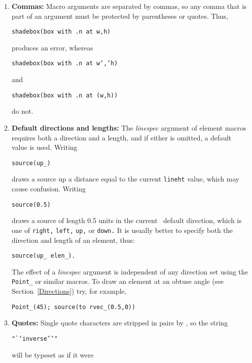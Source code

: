 \begin{enumerate}
{\tt line from A to B; resistor from B to C}

\noindent when it should be

{\tt line from A to B; resistor(from B to C)}

\noindent This error is caused by an unfortunate inconsistency between the
linear \pic\ objects and the way \Mfour\ passes macro arguments.

\item 
{\bf Commas:}
Macro arguments are separated by commas, so any comma that is
part of an argument must be protected by parentheses or quotes.  Thus,

{\tt shadebox(box with .n at w,h)}

\noindent produces an error, whereas

{\tt shadebox(box with .n at w`,'h)}

\noindent and

{\tt shadebox(box with .n at (w,h))}

\noindent do not.

\item 
{\bf Default directions and lengths:}
The {\em linespec} argument of element
macros requires both a direction and a length, and if either is omitted,
a default value is used.  Writing

{\tt source(up\_)}

\noindent draws a source up a distance equal to the current
{\tt lineht} value, which may cause confusion.
Writing

{\tt source(0.5)}

\noindent draws a source of length 0.5 units
in the current \pic\ default direction, which is one of
{\tt right,} {\tt left,} {\tt up,} or {\tt down.}
It is usually better
to specify both the direction and length of an element, thus:

{\tt source(up\_ elen\_).}

The effect of a {\em linespec} argument is independent of any direction
set using the {\tt Point\_} or similar macros. 
To draw an element at an obtuse angle (see Section~\ref{Directions}) try,
for example,

{\tt Point\_(45); source(to rvec\_(0.5,0))}

\item 
{\bf Quotes:} Single quote characters are stripped in pairs by \Mfour,
so the string

{\tt "`{}`inverse'{}'"}

\noindent will be typeset as if it were


\end{enumerate}
